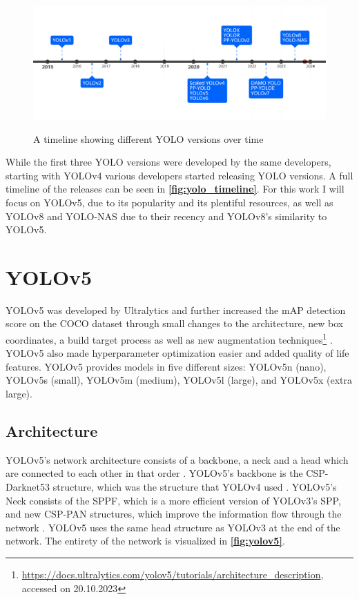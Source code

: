 \documentclass[10pt]{book}
\newcommand{\figureref}[1]{\textbf{\autoref{#1}}}
\begin{document}
\begin{figure}
  \caption{A timeline showing different \ac{YOLO} versions over time}
  \includegraphics[width=\textwidth]{image/timeline_fix}
  \label{fig:yolo_timeline}
\end{figure}

While the first three \ac{YOLO} versions were developed by the same developers, starting with \ac{YOLO}v4 various developers started releasing \ac{YOLO} versions. A full timeline of the releases can be seen in \figureref{fig:yolo_timeline}. For this work I will focus on \ac{YOLO}v5, due to its popularity and its plentiful resources, as well as \ac{YOLO}v8 and \ac{YOLO}-NAS due to their recency and \ac{YOLO}v8's similarity to \ac{YOLO}v5.

\section{YOLOv5}

\ac{YOLO}v5 was developed by Ultralytics and further increased the mAP detection score on the COCO dataset through small changes to the architecture, new box coordinates, a build target process as well as new augmentation techniques\footnote{\url{https://docs.ultralytics.com/yolov5/tutorials/architecture_description}, accessed on 20.10.2023} \cite{gjocher2022yolov5,terven2023comprehensive}. \ac{YOLO}v5 also made hyperparameter optimization easier and added quality of life features. \ac{YOLO}v5 provides models in five different sizes: \ac{YOLO}v5n (nano), \ac{YOLO}v5s (small), \ac{YOLO}v5m (medium), \ac{YOLO}v5l (large), and \ac{YOLO}v5x (extra large).

\subsection{Architecture}

\ac{YOLO}v5's network architecture consists of a backbone, a neck and a head which are connected to each other in that order \cite{jani2023model}. \ac{YOLO}v5's backbone is the CSP-Darknet53 structure, which was the structure that \ac{YOLO}v4 used \cite{bochkovskiy2020yolov4}. \ac{YOLO}v5's Neck consists of the SPPF, which is a more efficient version of \ac{YOLO}v3's \ac{SPP}, and new \ac{CSP-PAN} structures, which improve the information flow through the network \cite{liu2018path}. \ac{YOLO}v5 uses the same head structure as \ac{YOLO}v3 at the end of the network. The entirety of the network is visualized in \figureref{fig:yolov5}.
\end{document}
